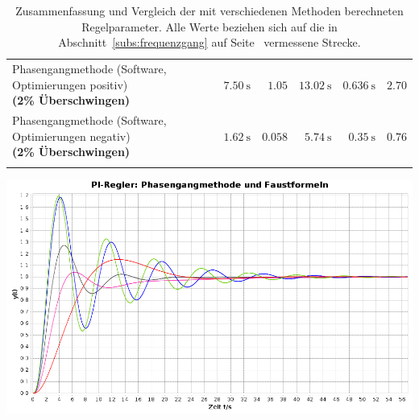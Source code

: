 \begin{longtable}{p{85mm}rrrrr}
    \addlinespace[0.5em]

    \pbox{84mm}{Phasengangmethode (Software, Optimierungen positiv) \\ \small{\textbf{(2\% \"Uberschwingen)}} \\}
    &
    $\SI{7.50}{\second}$
    &
    $1.05$
    &
    $\SI{13.02}{\second}$
    &
    $\SI{0.636}{\second}$
    &
    $2.70$
    \\

    \addlinespace[0.5em]

    \pbox{84mm}{Phasengangmethode (Software, Optimierungen negativ) \\ \small{\textbf{(2\% \"Uberschwingen)}} \\}
    &
    $\SI{1.62}{\second}$
    &
    $0.058$
    &
    $\SI{5.74}{\second}$
    &
    $\SI{0.35}{\second}$
    &
    $0.76$
    \\

    \addlinespace[0.5em]


    \bottomrule
    \caption{%
        Zusammenfassung     und     Vergleich    der     mit     verschiedenen
        Methoden     berechneten    Regelparameter. Alle     Werte    beziehen
        sich    auf     die    in     Abschnitt~\ref{subs:frequenzgang}    auf
        Seite~\pageref{subs:frequenzgang} vermessene Strecke.
    }
\label{tab:allresults}
\end{longtable}


\begin{minipage}[c][][b]{.75\textwidth}
    \includegraphics[width=\textwidth]{images/comparisonPI015.png}
\end{minipage}
\begin{minipage}[c][][b]{.22\textwidth}
    \label{fig:comparisonPI015}
\end{minipage}

